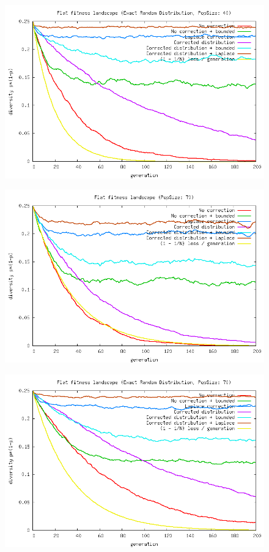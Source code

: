 \documentclass[a4paper,twoside]{report}
\begin{document}
\begin{figure}[htp]
\includegraphics[scale=0.5]{graph_haystack003_diversity.png}
\end{figure}
\begin{figure}[htp]
\includegraphics[scale=0.5]{graph_haystack004_diversity.png}
\end{figure}
\begin{figure}[htp]
\includegraphics[scale=0.5]{graph_haystack005_diversity.png}
\end{figure}
\end{document}
